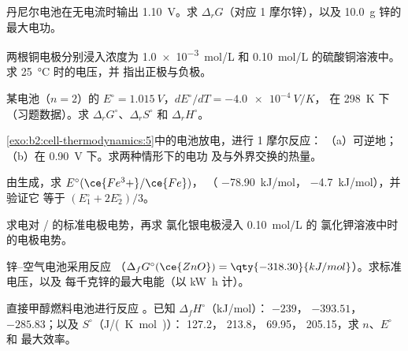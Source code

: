 \begin{exercise}[$\star$]\label{exo:b2:cell-thermodynamics:3}
丹尼尔电池在无电流时输出 \qty{1.10}{V}。求 $\Delta_r G$（对应
1 摩尔锌），以及 \qty{10.0}{g} 锌的最大电功。
\end{exercise}

\begin{exercise}[$\star$]\label{exo:b2:cell-thermodynamics:4}
两根铜电极分别浸入浓度为 \qty{1.0e-3}{mol/L}
和 \qty{0.10}{mol/L} 的硫酸铜溶液中。求 \qty{25}{\degreeCelsius} 时的电压，并
指出正极与负极。
\end{exercise}

\begin{exercise}[$\star\star$]\label{exo:b2:cell-thermodynamics:5}
某电池（$n = 2$）的 $E^\circ = \qty{1.015}{V}$，$dE^\circ/dT = \qty{-4.0e-4}{V/K}$，
在 \qty{298}{K} 下（习题数据）。求 $\Delta_r G^\circ$、$\Delta_r S^\circ$ 和
$\Delta_r H^\circ$。
\end{exercise}

\begin{exercise}[$\star\star$]\label{exo:b2:cell-thermodynamics:6}
\cref{exo:b2:cell-thermodynamics:5}中的电池放电，进行 1 摩尔反应：
（a）可逆地；（b）在 \qty{0.90}{V} 下。求两种情形下的电功
及与外界交换的热量。
\end{exercise}

\begin{exercise}[$\star\star$]\label{exo:b2:cell-thermodynamics:7}
由生成，求 $E^\circ(\ce{Fe^3+}/\ce{Fe})$，
（ \qty{-78.90}{kJ/mol}， \qty{-4.7}{kJ/mol}），并验证它
等于 $(E_1^\circ + 2E_2^\circ)/3$。
\end{exercise}

\begin{exercise}[$\star\star$]\label{exo:b2:cell-thermodynamics:8}
求电对 / 的标准电极电势，再求
氯化银电极浸入 \qty{0.10}{mol/L} 的
氯化钾溶液中时的电极电势。
\end{exercise}

\begin{exercise}[$\star\star$]\label{exo:b2:cell-thermodynamics:9}
锌–空气电池采用反应 （$\Delta_f G^\circ(\ce{ZnO}) =
\qty{-318.30}{kJ/mol}$）。求标准电压，以及
每千克锌的最大电能（以 \unit{kW.h} 计）。
\end{exercise}

\begin{exercise}[$\star\star\star$]\label{exo:b2:cell-thermodynamics:10}
直接甲醇燃料电池进行反应 。已知
$\Delta_f H^\circ$（\unit{kJ/mol}）： $-239$， $-393.51$，
 $-285.83$；以及 $S^\circ$（\unit{J/(K.mol)}）： 127.2，
 213.8， 69.95， 205.15，求 $n$、$E^\circ$ 和
最大效率。
\end{exercise}


